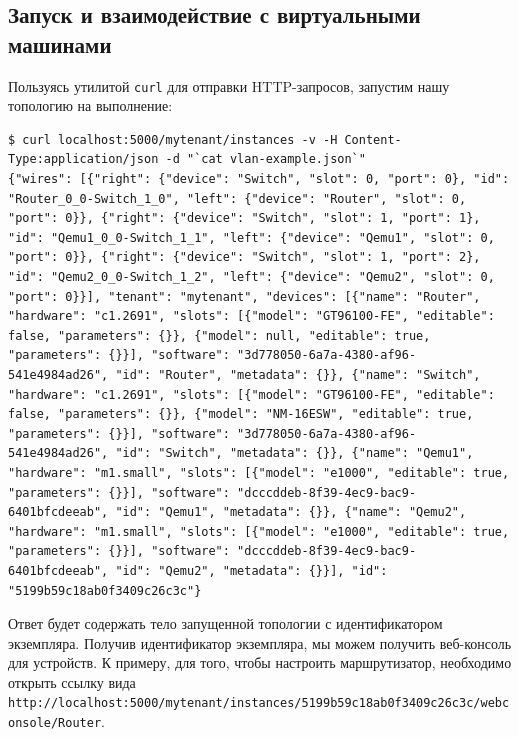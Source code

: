\subsection{Запуск и взаимодействие с виртуальными машинами}

Пользуясь утилитой \verb`curl` для отправки HTTP-запросов, запустим нашу топологию на выполнение:
\begin{lstlisting}
$ curl localhost:5000/mytenant/instances -v -H Content-Type:application/json -d "`cat vlan-example.json`"
{"wires": [{"right": {"device": "Switch", "slot": 0, "port": 0}, "id": "Router_0_0-Switch_1_0", "left": {"device": "Router", "slot": 0, "port": 0}}, {"right": {"device": "Switch", "slot": 1, "port": 1}, "id": "Qemu1_0_0-Switch_1_1", "left": {"device": "Qemu1", "slot": 0, "port": 0}}, {"right": {"device": "Switch", "slot": 1, "port": 2}, "id": "Qemu2_0_0-Switch_1_2", "left": {"device": "Qemu2", "slot": 0, "port": 0}}], "tenant": "mytenant", "devices": [{"name": "Router", "hardware": "c1.2691", "slots": [{"model": "GT96100-FE", "editable": false, "parameters": {}}, {"model": null, "editable": true, "parameters": {}}], "software": "3d778050-6a7a-4380-af96-541e4984ad26", "id": "Router", "metadata": {}}, {"name": "Switch", "hardware": "c1.2691", "slots": [{"model": "GT96100-FE", "editable": false, "parameters": {}}, {"model": "NM-16ESW", "editable": true, "parameters": {}}], "software": "3d778050-6a7a-4380-af96-541e4984ad26", "id": "Switch", "metadata": {}}, {"name": "Qemu1", "hardware": "m1.small", "slots": [{"model": "e1000", "editable": true, "parameters": {}}], "software": "dcccddeb-8f39-4ec9-bac9-6401bfcdeeab", "id": "Qemu1", "metadata": {}}, {"name": "Qemu2", "hardware": "m1.small", "slots": [{"model": "e1000", "editable": true, "parameters": {}}], "software": "dcccddeb-8f39-4ec9-bac9-6401bfcdeeab", "id": "Qemu2", "metadata": {}}], "id": "5199b59c18ab0f3409c26c3c"}
\end{lstlisting}
Ответ будет содержать тело запущенной топологии с идентификатором экземпляра. Получив идентификатор экземпляра, мы можем 
получить веб-консоль для устройств. К примеру, для того, чтобы настроить маршрутизатор, необходимо открыть ссылку
вида \verb`http://localhost:5000/mytenant/instances/5199b59c18ab0f3409c26c3c/webconsole/Router`.

